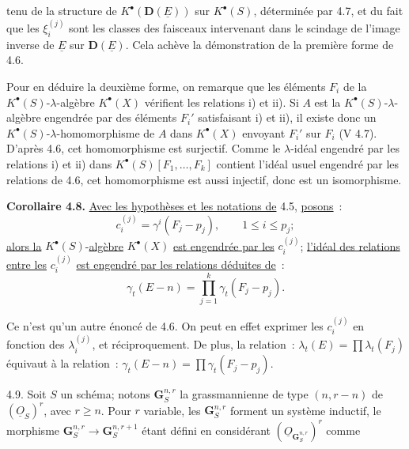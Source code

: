 
tenu de la structure de \(K^{\bullet}(\mathbf D(\underline{E}))\) sur \(K^{\bullet}(S)\), déterminée par 4.7, et du fait que les \(\xi_i^{(j)}\) sont les classes des faisceaux intervenant dans le scindage de l'image inverse de \(\underline{E}\) sur \(\mathbf D(\underline{E})\). Cela achève la démonstration de la première forme de 4.6.

Pour en déduire la deuxième forme, on remarque que les éléments \(F_i\) de la \(K^{\bullet}(S)\)-\(\lambda\)-algèbre \(K^{\bullet}(X)\) vérifient les relations i) et ii). Si \(A\) est la \(K^{\bullet}(S)\)-\(\lambda\)-algèbre engendrée par des éléments \(F_i'\) satisfaisant i) et ii), il existe donc un \(K^{\bullet}(S)\)-\(\lambda\)-homomorphisme de \(A\) dans \(K^{\bullet}(X)\) envoyant \(F_i'\) sur \(F_i\) (V 4.7). D'après 4.6, cet homomorphisme est surjectif. Comme le \(\lambda\)-idéal engendré par les relations i) et ii) dans \(K^{\bullet}(S)[F_1,\ldots,F_k]\) contient l'idéal usuel engendré par les relations de 4.6, cet homomorphisme est aussi injectif, donc est un isomorphisme.

\textbf{Corollaire 4.8.} \uline{Avec les hypothèses et les notations de} 4.5, \uline{posons}~:
\[
  c_i^{(j)}=\gamma^i(F_j-p_j),
  \qquad 1\le i\le p_j;
\]
\uline{alors la} \(K^{\bullet}(S)\)-\uline{algèbre} \(K^{\bullet}(X)\) \uline{est engendrée par les} \(c_i^{(j)}\); \uline{l'idéal des relations entre les} \(c_i^{(j)}\) \uline{est engendré par les relations déduites de}~:
\[
  \gamma_t(E-n)=\prod_{j=1}^{k}\gamma_t(F_j-p_j).
\]

Ce n'est qu'un autre énoncé de 4.6. On peut en effet exprimer les \(c_i^{(j)}\) en fonction des \(\lambda_i^{(j)}\), et réciproquement. De plus, la relation~: \(\lambda_t(E)=\prod\lambda_t(F_j)\) équivaut à la relation~: \(\gamma_t(E-n)=\prod\gamma_t(F_j-p_j)\).

4.9.
Soit \(S\) un schéma; notons \(\mathbf G_S^{n,r}\) la grassmannienne de type \((n,r-n)\) de \((\underline{O}_S)^r\), avec \(r\ge n\). Pour \(r\) variable, les \(\mathbf G_S^{n,r}\) forment un système inductif, le morphisme \(\mathbf G_S^{n,r}\longrightarrow \mathbf G_S^{n,r+1}\) étant défini en considérant \((\underline{O}_{\mathbf G_S^{n,r}})^r\) comme
